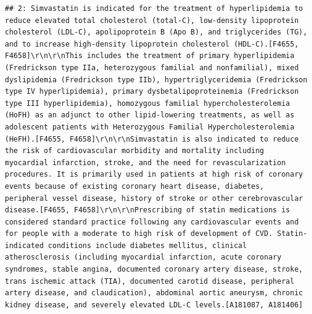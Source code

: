 \documentclass[
]{book}
\begin{document}
\begin{verbatim}
## 2: Simvastatin is indicated for the treatment of hyperlipidemia to reduce elevated total cholesterol (total-C), low-density lipoprotein cholesterol (LDL‑C), apolipoprotein B (Apo B), and triglycerides (TG), and to increase high-density lipoprotein cholesterol (HDL-C).[F4655, F4658]\r\n\r\nThis includes the treatment of primary hyperlipidemia (Fredrickson type IIa, heterozygous familial and nonfamilial), mixed dyslipidemia (Fredrickson type IIb), hypertriglyceridemia (Fredrickson type IV hyperlipidemia), primary dysbetalipoproteinemia (Fredrickson type III hyperlipidemia), homozygous familial hypercholesterolemia (HoFH) as an adjunct to other lipid-lowering treatments, as well as adolescent patients with Heterozygous Familial Hypercholesterolemia (HeFH).[F4655, F4658]\r\n\r\nSimvastatin is also indicated to reduce the risk of cardiovascular morbidity and mortality including myocardial infarction, stroke, and the need for revascularization procedures. It is primarily used in patients at high risk of coronary events because of existing coronary heart disease, diabetes, peripheral vessel disease, history of stroke or other cerebrovascular disease.[F4655, F4658]\r\n\r\nPrescribing of statin medications is considered standard practice following any cardiovascular events and for people with a moderate to high risk of development of CVD. Statin-indicated conditions include diabetes mellitus, clinical atherosclerosis (including myocardial infarction, acute coronary syndromes, stable angina, documented coronary artery disease, stroke, trans ischemic attack (TIA), documented carotid disease, peripheral artery disease, and claudication), abdominal aortic aneurysm, chronic kidney disease, and severely elevated LDL-C levels.[A181087, A181406]

\end{verbatim}
\end{document}
